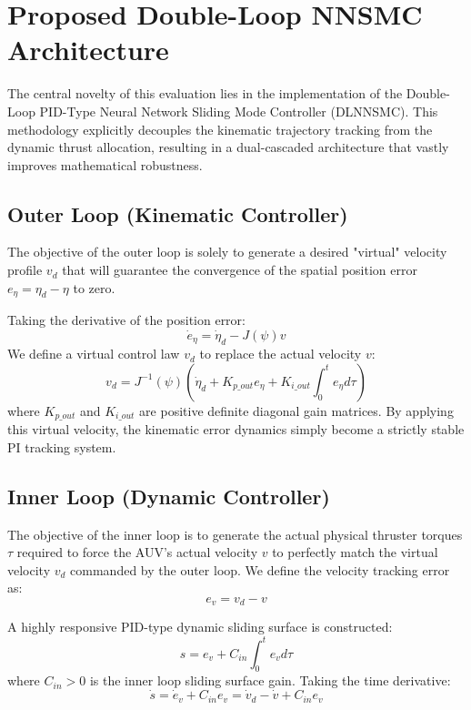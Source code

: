 \documentclass[conference]{IEEEtran}
\begin{document}
\section{Proposed Double-Loop NNSMC Architecture}
The central novelty of this evaluation lies in the implementation of the Double-Loop PID-Type Neural Network Sliding Mode Controller (DLNNSMC). This methodology explicitly decouples the kinematic trajectory tracking from the dynamic thrust allocation, resulting in a dual-cascaded architecture that vastly improves mathematical robustness.

\subsection{Outer Loop (Kinematic Controller)}
The objective of the outer loop is solely to generate a desired "virtual" velocity profile $v_d$ that will guarantee the convergence of the spatial position error $e_\eta = \eta_d - \eta$ to zero.

Taking the derivative of the position error:
\begin{equation}
\dot{e}_\eta = \dot{\eta}_d - J(\psi) v
\end{equation}
We define a virtual control law $v_d$ to replace the actual velocity $v$:
\begin{equation}
v_d = J^{-1}(\psi) \left( \dot{\eta}_d + K_{p\_out} e_\eta + K_{i\_out} \int_0^t e_\eta d\tau \right)
\end{equation}
where $K_{p\_out}$ and $K_{i\_out}$ are positive definite diagonal gain matrices. By applying this virtual velocity, the kinematic error dynamics simply become a strictly stable PI tracking system.

\subsection{Inner Loop (Dynamic Controller)}
The objective of the inner loop is to generate the actual physical thruster torques $\tau$ required to force the AUV's actual velocity $v$ to perfectly match the virtual velocity $v_d$ commanded by the outer loop. We define the velocity tracking error as:
\begin{equation}
e_v = v_d - v
\end{equation}

A highly responsive PID-type dynamic sliding surface is constructed:
\begin{equation}
s = e_v + C_{in} \int_0^t e_v d\tau
\end{equation}
where $C_{in} > 0$ is the inner loop sliding surface gain. Taking the time derivative:
\begin{equation}
\dot{s} = \dot{e}_v + C_{in} e_v = \dot{v}_d - \dot{v} + C_{in} e_v
\end{equation}
\end{document}
